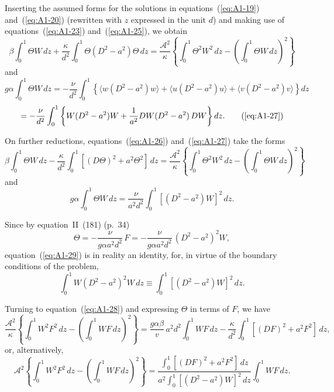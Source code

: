 Inserting the assumed forms for the solutions in equations~(\ref{eq:A1-19}) and~(\ref{eq:A1-20}) (rewritten with $z$ expressed in the unit $d$) and making use of equations~(\ref{eq:A1-23}) and~(\ref{eq:A1-25}), we obtain
\begin{equation}
\label{eq:A1-26}
\beta \int_0^1 \Theta W \, dz + \frac{\kappa}{d^2} \int_0^1 \Theta(D^2 - a^2)\Theta \, dz = \frac{\mathscr{A}^2}{\kappa} \left\{ \int_0^1 \Theta^2 W^2 \, dz - \left( \int_0^1 \Theta W \, dz \right)^{\!2} \right\}
\end{equation}
and
\begin{equation}
\label{eq:A1-27}
g\alpha \int_0^1 \Theta W \, dz = -\frac{\nu}{d^2} \int_0^1 \left\{ \langle w(D^2 - a^2)w \rangle + \langle u(D^2 - a^2)u \rangle + \langle v(D^2 - a^2)v \rangle \right\} dz
\end{equation}
\begin{equation*}
= -\frac{\nu}{d^2} \int_0^1 \left\{ W(D^2 - a^2)W + \frac{1}{a^2} DW(D^2 - a^2)\,DW \right\} dz. \tag{\ref{eq:A1-27}}
\end{equation*}

On further reductions, equations~(\ref{eq:A1-26}) and~(\ref{eq:A1-27}) take the forms
\begin{equation}
\label{eq:A1-28}
\beta \int_0^1 \Theta W \, dz - \frac{\kappa}{d^2} \int_0^1 [(D\Theta)^2 + a^2 \Theta^2] \, dz = \frac{\mathscr{A}^2}{\kappa} \left\{ \int_0^1 \Theta^2 W^2 \, dz - \left( \int_0^1 \Theta W \, dz \right)^{\!2} \right\}
\end{equation}
and
\begin{equation}
\label{eq:A1-29}
g\alpha \int_0^1 \Theta W \, dz = \frac{\nu}{a^2 d^2} \int_0^1 [(D^2 - a^2)W]^2 \, dz.
\end{equation}

Since by equation~II~(181) (p.~34)
\begin{equation}
\label{eq:A1-30}
\Theta = -\frac{\nu}{g\alpha a^2 d^2}\, F = -\frac{\nu}{g\alpha a^2 d^2}\,(D^2 - a^2)^2 W,
\end{equation}
equation~(\ref{eq:A1-29}) is in reality an identity, for, in virtue of the boundary conditions of the problem,
\begin{equation}
\label{eq:A1-31}
\int_0^1 W(D^2 - a^2)^2 W \, dz \equiv \int_0^1 [(D^2 - a^2)W]^2 \, dz.
\end{equation}

Turning to equation~(\ref{eq:A1-28}) and expressing $\Theta$ in terms of $F$, we have
\begin{equation}
\label{eq:A1-32}
\frac{\mathscr{A}^2}{\kappa} \left\{ \int_0^1 W^2 F^2 \, dz - \left( \int_0^1 WF \, dz \right)^{\!2} \right\} = \frac{g\alpha \beta}{v}\, a^2 d^2 \int_0^1 WF \, dz -
\frac{\kappa}{d^2} \int_0^1 [(DF)^2 + a^2 F^2] \, dz,
\end{equation}
or, alternatively,
\begin{equation}
\label{eq:A1-33}
\mathscr{A}^2 \left\{ \int_0^1 W^2 F^2 \, dz - \left( \int_0^1 WF \, dz \right)^{\!2} \right\} = \frac{\displaystyle\int_0^1 [(DF)^2 + a^2 F^2] \, dz}{a^2 \displaystyle\int_0^1 [(D^2 - a^2)W]^2 \, dz} \int_0^1 WF \, dz.
\end{equation}

